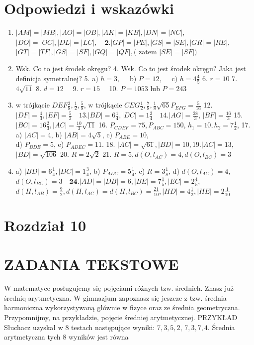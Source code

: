 \documentclass[10pt]{article}
\begin{document}
\section*{Odpowiedzi i wskazówki}
\begin{enumerate}
  \item \(|A M|=|M B|,|A O|=|O B|,|A K|=|K B|,|D N|=|N C|\),\\
\(|D O|=|O C|,|D L|=|L C|, \quad \mathbf{2 .}|G P|=|P E|,|G S|=|S E|,|G R|=|R E|\), \(|G T|=|T F|,|G S|=|S F|,|G Q|=|Q F|,(\) zatem \(|S E|=|S F|)\)
  \item Wsk. Co to jest środek okręgu? 4. Wsk. Co to jest środek okręgu? Jaka jest definicja symetralnej? 5. a) \(h=3, \quad\) b) \(P=12, \quad\) c) \(h=4 \frac{4}{5}\) 6. \(r=10\) 7. \(4 \sqrt{11}\) 8. \(d=12 \quad\) 9. \(r=15 \quad\) 10. \(P=1053\) lub \(P=243\)
  \item w trójkącie \(D E F \frac{3}{8}, \frac{1}{2}, \frac{5}{8}\), w trójkącie \(C E G \frac{1}{2}, \frac{7}{8}, \frac{1}{8} \sqrt{65} P_{E F G}=\frac{5}{16}\) 12. \(|D F|=\frac{4}{3},|E F|=\frac{5}{3} \quad 13 .|B D|=6 \frac{1}{4},|D C|=1 \frac{3}{4} \quad 14 .|A G|=\frac{28}{3}\), \(|B F|=\frac{16}{3}\) 15. \(|B C|=16 \frac{2}{3},|A C|=\frac{10}{3} \sqrt{11}\) 16. \(P_{C D E F}=75, P_{A B C}=150\), \(h_{1}=10, h_{2}=7 \frac{1}{2}\), 17. a) \(|A C|=4\), b) \(|A B|=4 \sqrt{5}\), c) \(P_{A B E}=10\),\\
d) \(P_{B D E}=5\), e) \(P_{A D E C}=11\). 18. \(|A C|=\sqrt{61},|B D|=10,19 .|A C|=13\), \(|B D|=\sqrt{106}\) 20. \(R=2 \sqrt{2}\) 21. \(R=5, d\left(O, l_{A C}\right)=4, d\left(O, l_{B C}\right)=3\)
  \item a) \(|B D|=6 \frac{1}{4},|D C|=1 \frac{3}{4}\), b) \(P_{A D C}=5 \frac{1}{4}\), c) \(R=3 \frac{1}{8}\), d) \(d\left(O, l_{A C}\right)=4\), \(d\left(O, l_{B C}\right)=3 \quad \mathbf{2 4} .|A D|=|D B|=6,|B E|=7 \frac{1}{5},|E C|=2 \frac{4}{5}\), \(d\left(H, l_{A B}\right)=\frac{9}{2}, d\left(H, l_{A C}\right)=d\left(H, l_{B C}\right)=\frac{21}{10},|H D|=4 \frac{1}{2},|H E|=2 \frac{1}{10}\)
\end{enumerate}

\section*{Rozdział 10}
\section*{ZADANIA TEKSTOWE}
W matematyce posługujemy się pojęciami różnych tzw. średnich. Znasz już średniq arytmetyczna. W gimnazjum zapoznasz się jeszcze z tzw. średnia harmoniczna wykorzystywaną głównie w fizyce oraz ze średnia geometryczna. Przypomnijmy, na przykładzie, pojęcie średniej arytmetycznej. PRZYKŁAD Słuchacz uzyskał w 8 testach następujące wyniki: \(7,3,5,2\), \(7,3,7,4\). Średnia arytmetyczna tych 8 wyników jest równa
\end{document}
